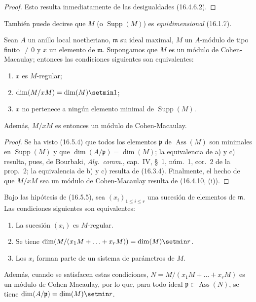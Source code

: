 \begin{proof}
Esto resulta inmediatamente de las desigualdades (16.4.6.2).
\end{proof}

También puede decirse que $M$ (o $\operatorname{Supp}(M)$) es
\emph{equidimensional} (16.1.7).


\begin{proposition}[16.5.5]
\label{0.16.5.5-es}
Sean $A$ un anillo local noetheriano, $\mathfrak{m}$ su ideal maximal, $M$
un $A$-módulo de tipo finito $\neq0$ y $x$ un elemento de $\mathfrak{m}$.
Supongamos que $M$ es un módulo de Cohen-Macaulay; entonces las condiciones
siguientes son equivalentes:
\begin{enumerate}
  \item[\textup{a)}] $x$ es $M$-regular;
  \item[\textup{b)}] $\dim(M/xM)=\dim(M)\setmin 1$;
  \item[\textup{c)}] $x$ no pertenece a ningún elemento minimal de
  $\operatorname{Supp}(M)$.
\end{enumerate}
Además, $M/xM$ es entonces un módulo de Cohen-Macaulay.
\end{proposition}

\begin{proof}
Se ha visto (16.5.4) que todos los elementos $\mathfrak{p}$ de
$\operatorname{Ass}(M)$ son minimales en $\operatorname{Supp}(M)$ y que
$\dim(A/\mathfrak{p})=\dim(M)$; la equivalencia de a) y c) resulta, pues, de
Bourbaki, \emph{Alg.~comm.}, cap.~IV, \S~1, núm.~1, cor.~2 de la prop.~2;
la equivalencia de b) y c) resulta de (16.3.4). Finalmente, el hecho de que
$M/xM$ sea un módulo de Cohen-Macaulay resulta de (16.4.10, (i)).
\end{proof}

\begin{corollary}[16.5.6]
\label{0.16.5.6-es}
Bajo las hipótesis de \textup{(16.5.5)}, sea $(x_i)_{1\leq i\leq r}$ una sucesión
de elementos de $\mathfrak{m}$. Las condiciones siguientes son equivalentes:
\begin{enumerate}
  \item[\textup{a)}] La sucesión $(x_i)$ es $M$-regular.
  \item[\textup{b)}] Se tiene
  $\dim(M/(x_1M+\ldots+x_rM))=\dim(M)\setmin r$.
  \item[\textup{c)}] Los $x_i$ forman parte de un sistema de parámetros de $M$.
\end{enumerate}
Además, cuando se satisfacen estas condiciones,
$N=M/(x_1M+\ldots+x_rM)$ es un módulo de Cohen-Macaulay, por lo que, para todo
ideal $\mathfrak{p}\in\operatorname{Ass}(N)$, se tiene
$\dim(A/\mathfrak{p})=\dim(M)\setmin r$.
\end{corollary}

